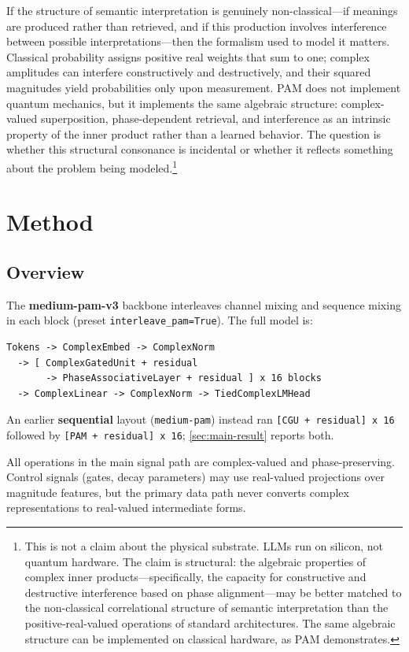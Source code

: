 \documentclass[11pt]{article}
\begin{document}
If the structure of semantic interpretation is genuinely non-classical---if meanings are produced rather than retrieved, and if this production involves interference between possible interpretations---then the formalism used to model it matters. Classical probability assigns positive real weights that sum to one; complex amplitudes can interfere constructively and destructively, and their squared magnitudes yield probabilities only upon measurement. PAM does not implement quantum mechanics, but it implements the same algebraic structure: complex-valued superposition, phase-dependent retrieval, and interference as an intrinsic property of the inner product rather than a learned behavior. The question is whether this structural consonance is incidental or whether it reflects something about the problem being modeled.\footnote{This is not a claim about the physical substrate. LLMs run on silicon, not quantum hardware. The claim is structural: the algebraic properties of complex inner products---specifically, the capacity for constructive and destructive interference based on phase alignment---may be better matched to the non-classical correlational structure of semantic interpretation than the positive-real-valued operations of standard architectures. The same algebraic structure can be implemented on classical hardware, as PAM demonstrates.}

\section{Method}
\label{sec:method}

\subsection{Overview}
The \textbf{medium-pam-v3} backbone interleaves channel mixing and sequence mixing in each block (preset \texttt{interleave\_pam=True}). The full model is:
\begin{verbatim}
Tokens -> ComplexEmbed -> ComplexNorm
  -> [ ComplexGatedUnit + residual
       -> PhaseAssociativeLayer + residual ] x 16 blocks
  -> ComplexLinear -> ComplexNorm -> TiedComplexLMHead
\end{verbatim}
An earlier \textbf{sequential} layout (\texttt{medium-pam}) instead ran \texttt{[CGU + residual] x 16} followed by \texttt{[PAM + residual] x 16}; \cref{sec:main-result} reports both.

All operations in the main signal path are complex-valued and phase-preserving. Control signals (gates, decay parameters) may use real-valued projections over magnitude features, but the primary data path never converts complex representations to real-valued intermediate forms.
\end{document}
